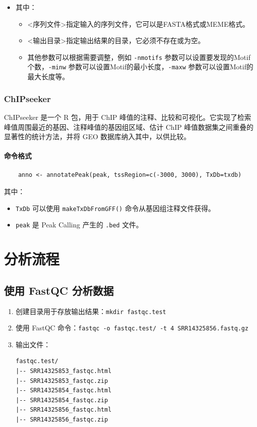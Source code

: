 \documentclass[UTF8]{ctexart}
\begin{document}
\begin{itemize}
	\item 其中：
	\begin{itemize}
		\item <序列文件>指定输入的序列文件，它可以是FASTA格式或MEME格式。
		\item <输出目录>指定输出结果的目录，它必须不存在或为空。
		\item 其他参数可以根据需要调整，例如 \verb|-nmotifs| 参数可以设置要发现的Motif个数，\verb|-minw| 参数可以设置Motif的最小长度，\verb|-maxw| 参数可以设置Motif的最大长度等。
	\end{itemize}
\end{itemize}

\subsubsection{ChIPseeker}

ChIPseeker 是一个 R 包，用于 ChIP 峰值的注释、比较和可视化。它实现了检索峰值周围最近的基因、注释峰值的基因组区域、估计 ChIP 峰值数据集之间重叠的显著性的统计方法，并将 GEO 数据库纳入其中，以供比较。

\paragraph*{命令格式}
\begin{lstlisting}
	anno <- annotatePeak(peak, tssRegion=c(-3000, 3000), TxDb=txdb)
\end{lstlisting}

其中：

\begin{itemize}
	\item \verb|TxDb| 可以使用 \verb|makeTxDbFromGFF()| 命令从基因组注释文件获得。
	\item \verb|peak| 是 Peak Calling 产生的 \verb|.bed| 文件。 
\end{itemize}

\section{分析流程}

\subsection{使用 FastQC 分析数据}

\begin{enumerate}
	\item 创建目录用于存放输出结果：\verb|mkdir fastqc.test|
	\item 使用 FastQC 命令：\verb|fastqc -o fastqc.test/ -t 4 SRR14325856.fastq.gz |
	\item 输出文件：
	\begin{lstlisting}
fastqc.test/
|-- SRR14325853_fastqc.html
|-- SRR14325853_fastqc.zip
|-- SRR14325854_fastqc.html
|-- SRR14325854_fastqc.zip
|-- SRR14325856_fastqc.html
|-- SRR14325856_fastqc.zip
	\end{lstlisting}
\end{enumerate}
\end{document}
